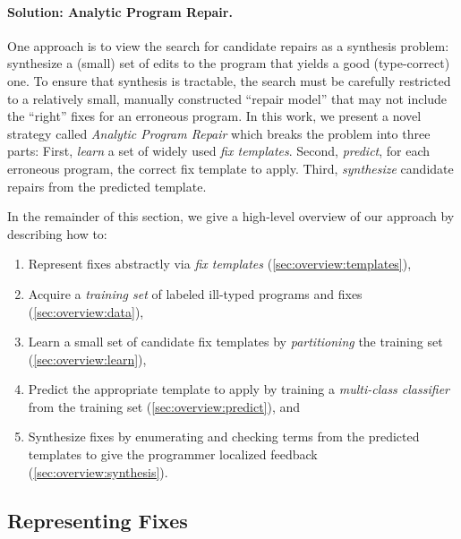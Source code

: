 \paragraph{Solution: Analytic Program Repair.}
%
One approach is to view the search for candidate repairs 
as a synthesis problem: synthesize a (small) set of edits 
to the program that yields a good (\eg type-correct) one.
%
To ensure that synthesis is tractable, the search must be 
carefully restricted to a relatively small, manually constructed 
``repair model'' that may not include the ``right'' fixes for 
an erroneous program.
%
In this work, we present a novel strategy called 
\emph{Analytic Program Repair} which breaks the 
problem into three parts:
%
First, \emph{learn} a set of widely used \emph{fix templates}.
%
Second, \emph{predict}, for each erroneous program, the correct fix template to apply.
%
Third, \emph{synthesize} candidate repairs from the predicted template.

In the remainder of this section, we give a high-level overview 
of our approach by describing how to:

\begin{enumerate}

  \item Represent fixes abstractly via \emph{fix templates}
        (\autoref{sec:overview:templates}),

  \item Acquire a \emph{training set} of labeled ill-typed programs and fixes
        (\autoref{sec:overview:data}),

  \item Learn a small set of candidate fix templates by \emph{partitioning}
        the training set (\autoref{sec:overview:learn}),

  \item Predict the appropriate template to apply by training a
        \emph{multi-class classifier} from the training set
        (\autoref{sec:overview:predict}), and

  \item Synthesize fixes by enumerating and checking terms from the
        predicted templates to give the programmer localized feedback
        (\autoref{sec:overview:synthesis}).
\end{enumerate}

\subsection{Representing Fixes}
\label{sec:overview:templates}


